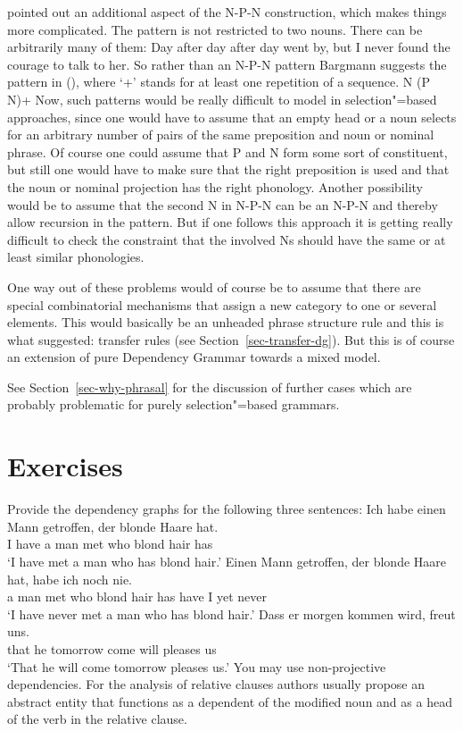 \citet{Bargmann2015a} pointed out an additional aspect of the N-P-N construction, which makes things
more complicated. The pattern is not restricted to two nouns. There can be arbitrarily many of them:
\ea
Day after day after day went by, but I never found the courage to talk to her.
\z
So rather than an N-P-N pattern Bargmann suggests the pattern in (), where `+'\is{$+$} stands for at
least one repetition of a sequence.
\ea
\label{n-p-n-plus-cx}
N (P N)+
\z
Now, such patterns would be really difficult to model in selection"=based approaches, since one
would have to assume that an empty head or a noun selects for an arbitrary number of pairs of the
same preposition and noun or nominal phrase. Of course one could assume that P and N form some sort
of constituent, but still one would have to make sure that the right preposition is used and that the
noun or nominal projection has the right phonology. Another possibility would be to assume that the
second N in N-P-N can be an N-P-N and thereby allow recursion in the pattern. But if one follows
this approach it is getting really difficult to check the constraint that the involved Ns should
have the same or at least similar phonologies.

One way out of these problems would of course be to assume that there are special combinatorial
mechanisms that assign a new category to one or several elements. This would basically be an
unheaded phrase structure rule and this is what \tes suggested: transfer rules (see
Section~\ref{sec-transfer-dg}). But this is of course an extension of pure Dependency Grammar
towards a mixed model.

See Section~\ref{sec-why-phrasal} for the discussion of further cases which are probably problematic
for purely selection"=based grammars.

\section*{Exercises}

Provide the dependency graphs for the following three sentences:
\eal
\ex 
\gll Ich habe einen Mann getroffen, der blonde Haare hat.\\
     I have a man met who blond hair has\\
\glt `I have met a man who has blond hair.'
\ex 
\gll Einen Mann getroffen, der blonde Haare hat, habe ich noch nie.\\
     a man met who blond hair has have I yet never\\
\glt `I have never met a man who has blond hair.'
\ex 
\gll Dass er morgen kommen wird, freut uns.\\
     that he tomorrow come will pleases us\\
\glt `That he will come tomorrow pleases us.'
\zl
You may use non-projective dependencies. For the analysis of relative clauses authors usually propose
an abstract entity that functions as a dependent of the modified noun and as a head of the verb in
the relative clause.

